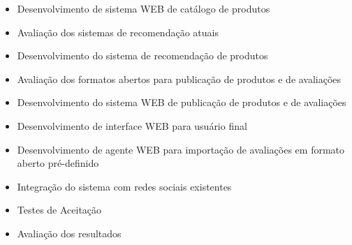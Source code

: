 \begin{itemize}

	\item Desenvolvimento de sistema WEB de catálogo de produtos 


	\item Avaliação dos sistemas de recomendação atuais


	\item Desenvolvimento do sistema de recomendação de produtos


	\item Avaliação dos formatos abertos para publicação de produtos e de avaliações


	\item Desenvolvimento do sistema WEB de publicação de produtos e de avaliações


	\item Desenvolvimento de interface WEB para usuário final


	\item Desenvolvimento de agente WEB para importação de avaliações em formato aberto pré-definido


	\item Integração do sistema com redes sociais existentes


	\item Testes de Aceitação

	\item Avaliação dos resultados
\end{itemize}





